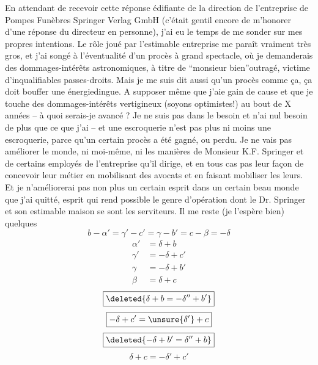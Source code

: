 En attendant de recevoir cette réponse édifiante de la direction de l'entreprise de Pompes Funèbres Springer Verlag GmbH (c'était gentil encore de m'honorer d'une réponse  du directeur en personne), j'ai eu le temps de me sonder sur mes propres intentions. Le rôle joué par l'estimable entreprise me paraît vraiment très gros, et j'ai songé à l'éventualité d'un procès à grand spectacle, où je demanderais des dommages-intérêts astronomiques, à titre de ``monsieur bien''\inserted{ }outragé,  victime d'inqualifiables passes-droits. Mais je me suis dit aussi  qu'un procès comme ça, ça doit bouffer une énergie\inserted{ }dingue. A supposer même que j'aie gain de cause et que je touche des dommages-intérêts vertigineux (soyons optimistes!)\inserted{,} au bout de X années\deleted{,} -- à quoi serais-je avancé ? Je ne suis pas dans le besoin et n'ai nul besoin de plus que ce que j'ai -- et une escroquerie n'est pas plus ni moins une escroquerie, parce qu'un certain procès a été gagné, ou perdu. Je ne vais pas améliorer le monde, ni moi-même, ni les manières de Monsieur K.F. Springer et de certains employés de l'entreprise qu'il dirige, et en tous cas pas leur façon de concevoir leur métier\inserted{,} en mobilisant des avocats et en  faisant mobiliser les leurs\inserted{(*)}.  Et je n'améliorerai pas non plus un certain esprit dans un certain beau monde que j'ai quitté,  esprit qui rend possible le genre d'opération dont le Dr. Springer et son estimable  maison se sont les serviteurs. Il me reste (je l'espère bien) quelques
\[b-\alpha'=\gamma'-c'=\gamma-b'=c-\beta=-\delta\]
\[\begin{aligned}
\alpha'&=\delta+b\\
\gamma'&=-\delta+c'\\
\gamma&=-\delta+b'\\
\beta&=\delta+c
\end{aligned}\]
\[\boxed{\deleted{\delta+b=-\delta''+b'}}\]
\[\boxed{-\delta+c'=\unsure{\delta'}+c}\]
\[\boxed{\deleted{-\delta+b'=\delta''+b}}\]
\[\boxed{\delta+c=-\delta'+c'}\]
